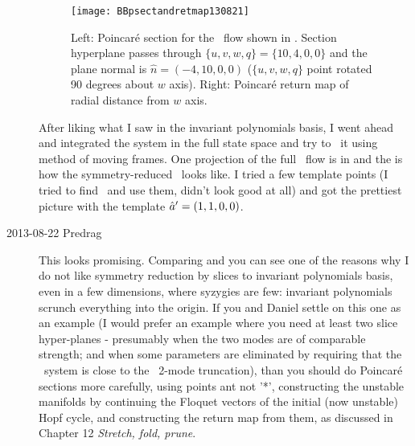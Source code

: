 \begin{description}

\begin{figure}%
  \begin{center}
  \texttt{[image: BBpsectandretmap130821]}
  \end{center}
  \caption{Left: Poincar\'e section for the \twomode\ flow shown in
  . Section hyperplane passes
  through $\{u,v,w,q\} = \{10, 4, 0, 0\}$ and the plane normal is
  $\hat{n} = (-4,10,0,0)$ ($\{u,v,w,q\}$  point rotated 90 degrees about $w$
  axis). Right: Poincar\'e return map of radial distance from $w$
  axis.}
  \label{fig:BBpsectandretmap130821}
\end{figure}

After liking what I saw in the invariant polynomials basis, I went ahead and integrated the system in the full state space and try to \slice\ it using method of moving frames. One projection of the full \statesp\ flow is in  and the  is how the symmetry-reduced \statesp\ looks like.
I tried a few template points (I tried to find \eqva\ and use them, didn't look good at all) and got the prettiest picture with the template ${\hat{a}'} = (1,1,0,0)$.



\item[2013-08-22 Predrag] This looks promising. Comparing
and
you can see one of the reasons why I do not like symmetry reduction by
slices to invariant polynomials basis, even in a few dimensions, where
syzygies are few: invariant polynomials scrunch everything into the
origin. If you and Daniel settle on this one as an example (I would
prefer an example where you need at least two slice hyper-planes -
presumably when the two modes are of comparable strength; and when
some parameters are eliminated by requiring that the \twomode\ system
is close to the \KS\ 2-mode truncation), than you should do
Poincar\'e sections more carefully, using points ant not '*',
constructing the unstable manifolds by continuing the Floquet vectors
of the initial (now unstable) Hopf cycle, and constructing the return
map from them, as discussed in
{Chapter 12} {\em Stretch, fold, prune}.


\end{description}
